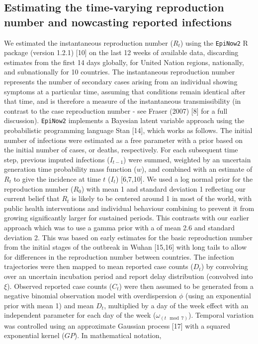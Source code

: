 \documentclass[
]{article}
\begin{document}
\hypertarget{estimating-the-time-varying-reproduction-number-and-nowcasting-reported-infections}{%
\subsection{Estimating the time-varying reproduction number and
nowcasting reported
infections}\label{estimating-the-time-varying-reproduction-number-and-nowcasting-reported-infections}}

We estimated the instantaneous reproduction number (\(R_t\)) using the
\texttt{EpiNow2} R package (version 1.2.1) {[}10{]} on the last 12 weeks
of available data, discarding estimates from the first 14 days globally,
for United Nation regions, nationally, and subnationally for 10
countries. The instantaneous reproduction number represents the number
of secondary cases arising from an individual showing symptoms at a
particular time, assuming that conditions remain identical after that
time, and is therefore a measure of the instantaneous transmissibility
(in contrast to the case reproduction number - see Fraser (2007) {[}8{]}
for a full discussion). \texttt{EpiNow2} implements a Bayesian latent
variable approach using the probabilistic programming language Stan
{[}14{]}, which works as follows. The initial number of infections were
estimated as a free parameter with a prior based on the initial number
of cases, or deaths, respectively. For each subsequent time step,
previous imputed infections (\(I_{t-1}\)) were summed, weighted by an
uncertain generation time probability mass function (\(w\)), and
combined with an estimate of \(R_t\) to give the incidence at time \(t\)
(\(I_t\)) {[}6,7,10{]}. We used a log normal prior for the reproduction
number (\(R_0\)) with mean 1 and standard deviation 1 reflecting our
current belief that \(R_t\) is likely to be centered around 1 in most of
the world, with public health interventions and individual behaviour
combining to prevent it from growing significantly larger for sustained
periods. This contrasts with our earlier approach which was to use a
gamma prior with a of mean 2.6 and standard deviation 2. This was based
on early estimates for the basic reproduction number from the initial
stages of the outbreak in Wuhan {[}15,16{]} with long tails to allow for
differences in the reproduction number between countries. The infection
trajectories were then mapped to mean reported case counts (\(D_t\)) by
convolving over an uncertain incubation period and report delay
distribution (convolved into \(\xi\)). Observed reported case counts
(\(C_t\)) were then assumed to be generated from a negative binomial
observation model with overdispersion \(\phi\) (using an exponential
prior with mean 1) and mean \(D_t\), multiplied by a day of the week
effect with an independent parameter for each day of the week
(\(\omega_{(t \mod 7)}\)). Temporal variation was controlled using an
approximate Gaussian process {[}17{]} with a squared exponential kernel
(\(GP\)). In mathematical notation,
\end{document}
